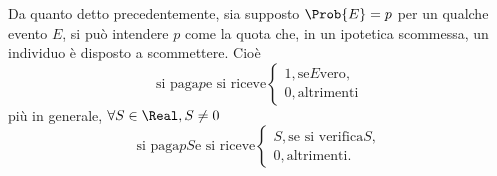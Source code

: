 \documentclass{subfiles}
\begin{document}
Da quanto detto precedentemente, sia supposto $\Prob{E} = p$ per un qualche evento $E$,
si può intendere $p$ come la quota che, in un ipotetica scommessa, un individuo è disposto a scommettere.
Cioè
$$\text{si paga} p \text{e si riceve} \begin{cases}
        1, \text{se} E \text{vero}, \\
        0, \text{altrimenti}
    \end{cases}$$
più in generale, $\forall S \in \Real, S \neq 0$
$$\text{si paga} pS \text{e si riceve} \begin{cases}
        S, \text{se si verifica} S, \\
        0, \text{altrimenti}.
    \end{cases}$$
\end{document}
